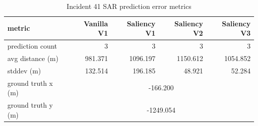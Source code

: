 \begin{table}[ht]
\centering
\caption{Incident 41 SAR prediction error metrics}
\label{tab:sar-incident-41}
\begin{tabular}{lrrrr}
\hline
metric & Vanilla V1 & Saliency V1 & Saliency V2 & Saliency V3 \\
\hline
prediction count & 3 & 3 & 3 & 3 \\
avg distance (m) & 981.371 & 1096.197 & 1150.612 & 1054.852 \\
stddev (m) & 132.514 & 196.185 & 48.921 & 52.284 \\
ground truth x (m) & \multicolumn{4}{c}{-166.200} \\
ground truth y (m) & \multicolumn{4}{c}{-1249.054} \\
\hline
\end{tabular}
\end{table}
